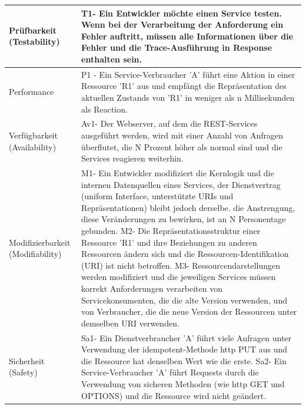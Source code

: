 \documentclass{acmsiggraph}
\begin{document}
\begin{center}
\begin{xtabular}{|C{2cm}|L{5,5cm}|}
 \\ 
    \hline
     Prüfbarkeit  (Testability) & 
     T1- Ein Entwickler möchte einen Service testen. Wenn bei der Verarbeitung der Anforderung ein Fehler auftritt, müssen alle Informationen über die Fehler und die Trace-Ausführung in Response enthalten sein. 
 \\ \hline
     Performance & 
     P1 - Ein Service-Verbraucher 'A' führt eine Aktion in einer Ressource 'R1' aus und empfängt die Repräsentation des aktuellen Zustands von 'R1' in weniger als n Millisekunden als Reaction.\\ 
    \hline
     Verfügbarkeit (Availability) & 
     Av1- Der Webserver, auf dem die REST-Services ausgeführt werden, wird mit einer Anzahl von Anfragen überflutet, die N Prozent höher als normal sind und die Services reagieren weiterhin.
 \\ 
    \hline
     Modifizierbarkeit  (Modifiability) & 
     M1- Ein Entwickler modifiziert die Kernlogik und die internen Datenquellen eines  Services, der Dienstvertrag (uniform Interface, unterstützte URIs und Repräsentationen) bleibt jedoch derselbe. die Anstrengung, diese Veränderungen zu bewirken, ist an N Personentage gebunden.
M2- Die Repräsentationsstruktur einer Ressource 'R1' und ihre Beziehungen zu anderen Ressourcen ändern sich und die Ressourcen-Identifikation (URI) ist nicht betroffen.
M3- Ressourcendarstellungen werden modifiziert und die jeweiligen Services müssen korrekt Anforderungen  verarbeiten von Servicekonsumenten, die die alte Version verwenden, und von Verbraucher, die die neue Version der Ressourcen unter demselben URI verwenden.

 \\ 
    \hline
     Sicherheit  (Safety) & 
     Sa1- Ein Dienstverbraucher 'A' führt viele Anfragen unter Verwendung der idempotent-Methode http PUT aus und die Ressource hat denselben Wert wie die erste.
Sa2- Ein Service-Verbraucher 'A' führt Requests durch die Verwendung von sicheren Methoden (wie http GET und OPTIONS) und die Ressource wird nicht geändert.


\end{xtabular}
\end{center}
\end{document}
